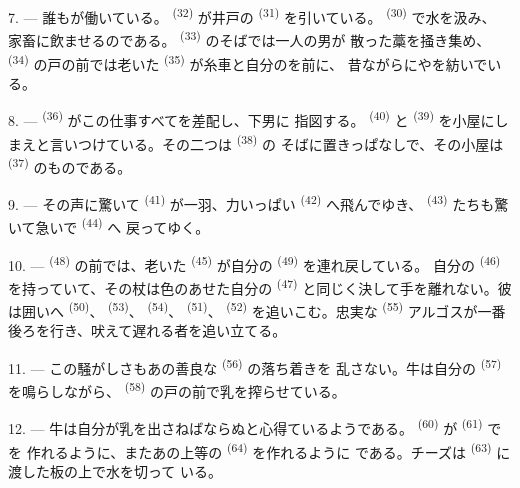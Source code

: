 7. --- 誰もが働いている。 \textsuperscript{(32)} が井戸の
\textsuperscript{(31)} を引いている。 \textsuperscript{(30)} で水を汲み、
家畜に飲ませるのである。 \textsuperscript{(33)} のそばでは一人の男が
散った藁を掻き集め、 \textsuperscript{(34)} の戸の前では老いた
 \textsuperscript{(35)} が糸車と自分のを前に、
昔ながらにやを紡いでいる。

\VUsaut{3.0mm}
\VUsaut{3.0mm}

8. ---  \textsuperscript{(36)} がこの仕事すべてを差配し、下男に
指図する。 \textsuperscript{(40)} と \textsuperscript{(39)}
を小屋にしまえと言いつけている。その二つは \textsuperscript{(38)} の
そばに置きっぱなしで、その小屋は \textsuperscript{(37)} のものである。

9. --- その声に驚いて \textsuperscript{(41)} が一羽、力いっぱい
 \textsuperscript{(42)} へ飛んでゆき、
\textsuperscript{(43)} たちも驚いて急いで \textsuperscript{(44)} へ
戻ってゆく。

10. ---  \textsuperscript{(48)} の前では、老いた
\textsuperscript{(45)} が自分の \textsuperscript{(49)} を連れ戻している。
自分の \textsuperscript{(46)} を持っていて、その杖は色のあせた自分の
 \textsuperscript{(47)} と同じく決して手を離れない。彼は囲いへ
 \textsuperscript{(50)}、 \textsuperscript{(53)}、
 \textsuperscript{(54)}、 \textsuperscript{(51)}、
 \textsuperscript{(52)} を追いこむ。忠実な
\textsuperscript{(55)} アルゴスが一番後ろを行き、吠えて遅れる者を追い立てる。

11. --- この騒がしさもあの善良な \textsuperscript{(56)} の落ち着きを
乱さない。牛は自分の \textsuperscript{(57)} を鳴らしながら、
\textsuperscript{(58)} の戸の前で乳を搾らせている。

12. --- 牛は自分が乳を出さねばならぬと心得ているようである。
\textsuperscript{(60)} が \textsuperscript{(61)} でを
作れるように、またあの上等の \textsuperscript{(64)} を作れるように
である。チーズは \textsuperscript{(63)} に渡した板の上で水を切って
いる。

